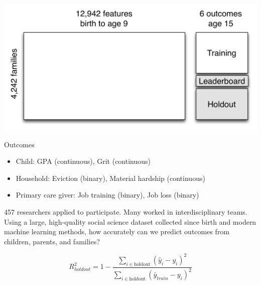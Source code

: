 \documentclass[aspectratio=169]{beamer}
\begin{document}
\begin{frame}

\begin{center}
\includegraphics[width=\textwidth]{figures/ffc_design_matrix_ml}
\end{center}

\end{frame}
\begin{frame}

Outcomes
\begin{itemize}
\item Child: GPA (continuous), Grit (continuous)
\item Household:  Eviction (binary), Material hardship (continuous)
\item Primary care giver: Job training (binary), Job loss (binary)
\end{itemize}

\end{frame}
\begin{frame}

457 researchers applied to participate. Many worked in interdisciplinary teams.
\pause
Using a large, high-quality social science dataset collected since birth and modern machine learning methods, how accurately can we predict outcomes from children, parents, and families?

\begin{equation*}
R^2_{holdout} = 1 - \frac{\sum_{i \in \text{holdout}} (\hat{y}_i - y_i)^2}{\sum_{i \in \text{holdout}} (\bar{y}_{train} - y_i)^2}
\end{equation*}

\end{frame}
\end{document}
